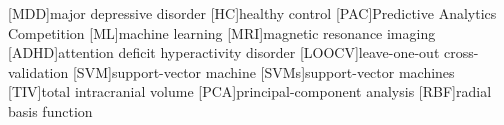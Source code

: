\begin{acronym}
    [MDD]{major depressive disorder}
    [HC]{healthy control}
    [PAC]{Predictive Analytics Competition}
    [ML]{machine learning}
    [MRI]{magnetic resonance imaging}
    [ADHD]{attention deficit hyperactivity disorder}
    [LOOCV]{leave-one-out cross-validation}
    [SVM]{support-vector machine}
    [SVMs]{support-vector machines}
    [TIV]{total intracranial volume}
    [PCA]{principal-component analysis}
    [RBF]{radial basis function}
\end{acronym}
